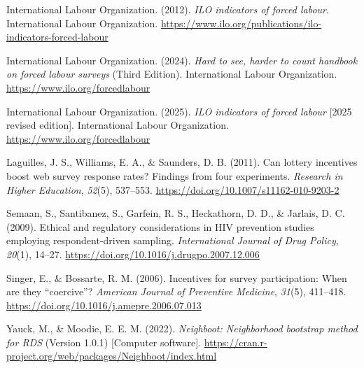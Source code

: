 \documentclass[
  12pt,
  letterpaper,
  DIV=11,
  numbers=noendperiod]{scrreprt}
\newlength{\cslhangindent}
\newenvironment{CSLReferences}[2] %
 {\begin{list}{}{%
  \setlength{\itemindent}{0pt}
  \setlength{\leftmargin}{0pt}
  \setlength{\parsep}{0pt}
  \ifodd #1
   \setlength{\leftmargin}{\cslhangindent}
   \setlength{\itemindent}{-1\cslhangindent}
  \fi
  \setlength{\itemsep}{#2\baselineskip}}}
 {\end{list}}
\begin{document}
\begin{CSLReferences}{1}{0}
International Labour Organization. (2012). \emph{ILO indicators of
forced labour}. International Labour Organization.
\url{https://www.ilo.org/publications/ilo-indicators-forced-labour}

International Labour Organization. (2024). \emph{Hard to see, harder to
count handbook on forced labour surveys} (Third Edition). International
Labour Organization. \url{https://www.ilo.org/forcedlabour}

International Labour Organization. (2025). \emph{ILO indicators of
forced labour} {[}2025 revised edition{]}. International Labour
Organization. \url{https://www.ilo.org/forcedlabour}

Laguilles, J. S., Williams, E. A., \& Saunders, D. B. (2011). Can
lottery incentives boost web survey response rates? Findings from four
experiments. \emph{Research in Higher Education}, \emph{52}(5),
537--553. \url{https://doi.org/10.1007/s11162-010-9203-2}

Semaan, S., Santibanez, S., Garfein, R. S., Heckathorn, D. D., \&
Jarlais, D. C. (2009). Ethical and regulatory considerations in {HIV}
prevention studies employing respondent-driven sampling.
\emph{International Journal of Drug Policy}, \emph{20}(1), 14--27.
\url{https://doi.org/10.1016/j.drugpo.2007.12.006}

Singer, E., \& Bossarte, R. M. (2006). Incentives for survey
participation: When are they {``coercive''}? \emph{American Journal of
Preventive Medicine}, \emph{31}(5), 411--418.
\url{https://doi.org/10.1016/j.amepre.2006.07.013}

Yauck, M., \& Moodie, E. E. M. (2022). \emph{Neighboot: Neighborhood
bootstrap method for {RDS}} (Version 1.0.1) {[}Computer software{]}.
\url{https://cran.r-project.org/web/packages/Neighboot/index.html}

\end{CSLReferences}
\end{document}
